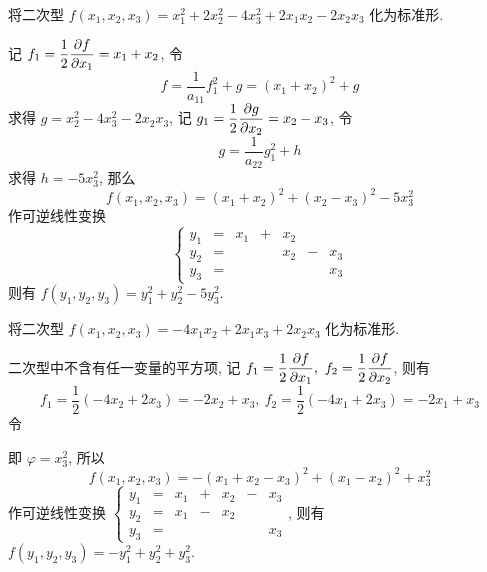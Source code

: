 \begin{example}
    将二次型 $f(x_1,x_2,x_3)=x_1^2+2x_2^2-4x_3^2+2x_1x_2-2x_2x_3$ 化为标准形.
\end{example}
\begin{solution}
    记 $f_1=\dfrac{1}{2}\displaystyle\pdv{f}{x_1}=x_1+x_2$, 令 $$f=\dfrac{1}{a_{11}}f_1^2+g=(x_1+x_2)^2+g$$
    求得 $g=x_2^2-4x_3^2-2x_2x_3$, 记 $g_1=\dfrac{1}{2}\displaystyle\pdv{g}{x_2}=x_2-x_3$, 令 $$g=\dfrac{1}{a_{22}}g_1^2+h$$
    求得 $h=-5x_3^2$, 那么 $$f(x_1,x_2,x_3)=(x_1+x_2)^2+(x_2-x_3)^2-5x_3^2$$
    作可逆线性变换 $$\left\{\begin{matrix}
            y_1 & = & x_1 & + & x_2           \\
            y_2 & = &     &   & x_2 & - & x_3 \\
            y_3 & = &     &   &     &   & x_3
        \end{matrix}\right.$$
    则有 $f(y_1,y_2,y_3)=y_1^2+y_2^2-5y_3^2.$
\end{solution}

\begin{example}
    将二次型 $f(x_1,x_2,x_3)=-4x_1x_2+2x_1x_3+2x_2x_3$ 化为标准形.
\end{example}
\begin{solution}
    二次型中不含有任一变量的平方项, 记 $f_1=\dfrac{1}{2}\displaystyle\pdv{f}{x_1},~f_2=\dfrac{1}{2}\displaystyle\pdv{f}{x_2}$, 则有
    $$f_1=\dfrac{1}{2}(-4x_2+2x_3)=-2x_2+x_3,~f_2=\dfrac{1}{2}(-4x_1+2x_3)=-2x_1+x_3$$
    令
    即 $\varphi=x_3^2$, 所以
    $$f(x_1,x_2,x_3)=-(x_1+x_2-x_3)^2+(x_1-x_2)^2+x_3^2$$
    作可逆线性变换 $\left\{\begin{matrix}
            y_1 & = & x_1 & + & x_2 & - & x_3 \\
            y_2 & = & x_1 & - & x_2 &         \\
            y_3 & = &     &   &     &   & x_3
        \end{matrix}\right.$, 则有 $f(y_1,y_2,y_3)=-y_1^2+y_2^2+y_3^2.$
\end{solution}

